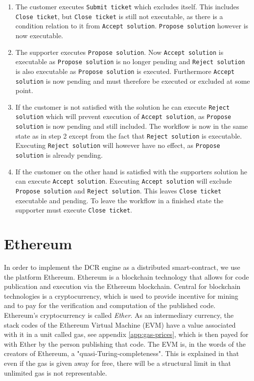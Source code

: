 \documentclass{article}
\begin{document}
	\begin{enumerate}
		\item The customer executes \texttt{Submit ticket} which excludes itself. 
		This includes \texttt{Close ticket}, but \texttt{Close ticket} is still not executable, as there is a condition relation to it from \texttt{Accept solution}.
		\texttt{Propose solution} however is now executable.
		\item The supporter executes \texttt{Propose solution}. Now \texttt{Accept solution} is executable as \texttt{Propose solution} is no longer pending and \texttt{Reject solution} is also executable as \texttt{Propose solution} is executed. 
		Furthermore \texttt{Accept solution} is now pending and must therefore be executed or excluded at some point.
		\item If the customer is not satisfied with the solution he can execute \texttt{Reject solution} which will prevent execution of \texttt{Accept solution}, as \texttt{Propose solution} is now pending and still included. 
		The workflow is now in the same state as in step 2 except from the fact that \texttt{Reject solution} is executable. 
		Executing \texttt{Reject solution} will however have no effect, as \texttt{Propose solution} is already pending.
		\item If the customer on the other hand is satisfied with the supporters solution he can execute \texttt{Accept solution}.
		Executing \texttt{Accept solution} will exclude \texttt{Propose solution} and \texttt{Reject solution}.
		This leaves \texttt{Close ticket} executable and pending.
		To leave the workflow in a finished state the supporter must execute \texttt{Close ticket}. 
	\end{enumerate}

	\section{Ethereum}
	In order to implement the DCR engine as a distributed smart-contract, we use the platform Ethereum. 
	Ethereum is a blockchain technology that allows for code publication and execution via the Ethereum blockchain.  
	Central for blockchain technologies is a cryptocurrency, which is used to provide incentive for mining and to pay for the verification and computation of the published code.
	Ethereum's cryptocurrency is called \emph{Ether}.
	As an intermediary currency, the stack codes of the Ethereum Virtual Machine (EVM) have a value associated with it in a unit called gas, see appendix \ref{app:gas-prices}, which is then payed for with Ether by the person publishing that code.
	The EVM is, in the words of the creators of Ethereum, a "quasi-Turing-completeness"\cite{yellow-paper}.
	This is explained in that even if the gas is given away for free, there will be a structural limit in that unlimited gas is not representable.
\end{document}
